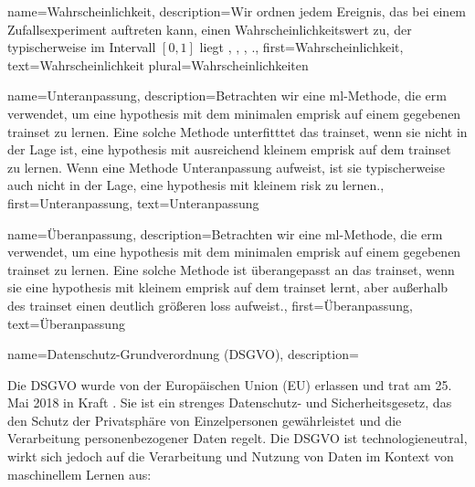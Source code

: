 {{{{		 
{name={Wahrscheinlichkeit},
	description={Wir ordnen jedem Ereignis, das bei einem Zufallsexperiment auftreten kann, 
	einen Wahrscheinlichkeitswert zu, der typischerweise im 
	Intervall $[0,1]$ liegt \cite{BertsekasProb}, \cite{HalmosMeasure}, \cite{BillingsleyProbMeasure}, \cite{KallenbergBook}.},
	first={Wahrscheinlichkeit},
	text={Wahrscheinlichkeit}
	plural={Wahrscheinlichkeiten}
}

{name={Unteranpassung},
	description={Betrachten wir eine \gls{ml}-Methode, die \gls{erm} verwendet, um eine \gls{hypothesis} mit dem
	 minimalen \gls{emprisk} auf einem gegebenen \gls{trainset} zu lernen. Eine solche Methode unterfitttet 
	 das \gls{trainset}, wenn sie nicht in der Lage ist, eine \gls{hypothesis} mit ausreichend kleinem \gls{emprisk} 
	 auf dem \gls{trainset} zu lernen. Wenn eine Methode Unteranpassung aufweist, ist sie typischerweise auch nicht 
	 in der Lage, eine \gls{hypothesis} mit kleinem \gls{risk} zu lernen.},
	first={Unteranpassung},
	text={Unteranpassung}
}


{name={Überanpassung}},
	description={Betrachten wir eine \gls{ml}-Methode, die \gls{erm} verwendet, um eine \gls{hypothesis} mit 
	dem minimalen \gls{emprisk} auf einem gegebenen \gls{trainset} zu lernen. Eine solche Methode ist überangepasst
	 an das \gls{trainset}, wenn sie eine \gls{hypothesis} mit kleinem \gls{emprisk} auf dem \gls{trainset} lernt,
	  aber außerhalb des \gls{trainset} einen deutlich größeren \gls{loss} aufweist.},
	first={Überanpassung},
	text=Überanpassung}
                        
    }

{name={Datenschutz-Grundverordnung (DSGVO)},
	description={Die DSGVO\cite{GDPR2016} 
			wurde von der Europäischen Union (EU) erlassen und trat am 25. Mai 2018 in Kraft \cite{GDPR2016}. 
			Sie ist ein strenges Datenschutz- und Sicherheitsgesetz, das den Schutz der Privatsphäre von Einzelpersonen gewährleistet und die Verarbeitung personenbezogener Daten regelt.
			Die DSGVO ist technologieneutral, wirkt sich jedoch auf die Verarbeitung und Nutzung von Daten im Kontext von maschinellem Lernen aus: 
			 
}}}}
